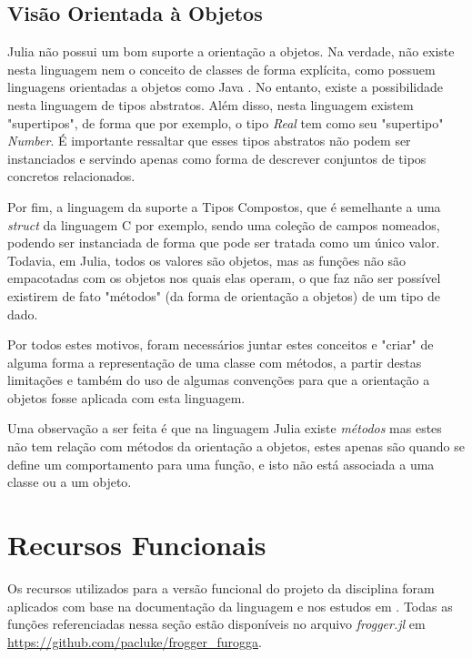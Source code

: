 \documentclass[rel_mlp]{iiufrgs}
\begin{document}
\section{Visão Orientada à Objetos}
 
 Julia não possui um bom suporte a orientação a objetos. Na verdade, não existe nesta linguagem nem o conceito de classes de forma explícita, como possuem linguagens orientadas a objetos como Java . No entanto, existe a possibilidade nesta linguagem de tipos abstratos. Além disso, nesta linguagem existem "supertipos", de forma que por exemplo, o tipo \textit{Real} tem como seu "supertipo" \textit{Number}. É importante ressaltar que esses tipos abstratos não podem ser instanciados e servindo apenas como forma de descrever conjuntos de tipos concretos relacionados. 
 
 Por fim, a linguagem da suporte a Tipos Compostos, que é semelhante a uma \textit{struct} da linguagem C por exemplo, sendo uma 
coleção de campos nomeados, podendo ser instanciada de forma que pode ser tratada como um único valor. Todavia, em Julia, todos os valores são objetos, mas as funções não são empacotadas com os objetos nos quais elas operam, o que faz não ser possível existirem de fato "métodos" (da forma de orientação a objetos)   de um tipo de dado.

Por todos estes motivos, foram necessários juntar estes conceitos e "criar" de alguma forma a representação de uma classe com métodos, a partir destas limitações e também do uso de algumas convenções para que a orientação a objetos fosse aplicada com esta linguagem.

Uma observação a ser feita é que na linguagem Julia existe \textit{métodos} mas estes não tem relação com métodos da orientação a objetos, estes apenas são quando se define  um comportamento para uma função, e isto não está associada a uma classe ou a um objeto.

 


 \chapter{Recursos Funcionais}
 
 Os recursos utilizados para a versão funcional do projeto da disciplina foram aplicados com base na documentação da linguagem \cite{Doc} e nos estudos em \cite{FuncPart}. Todas as funções referenciadas nessa seção estão disponíveis no arquivo \textit{frogger.jl} em \url{https://github.com/pacluke/frogger_furogga}.
 
\end{document}
